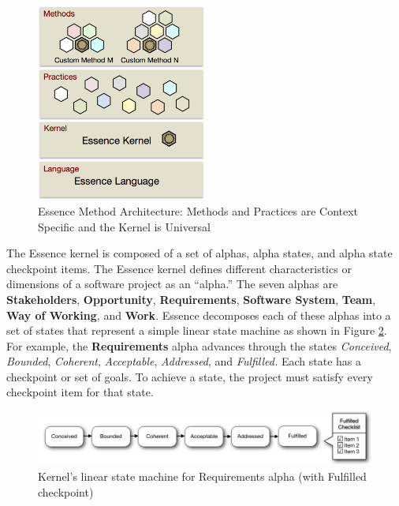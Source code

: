 \documentclass[preprint,12pt,3p]{elsarticle}
\begin{document}
\begin{figure}[h]\vspace*{4pt}
\centerline{\includegraphics[width=2.2in]{kernel_images/EssenceLayers}}
\caption{Essence Method Architecture: Methods and Practices are Context Specific and the Kernel is Universal}\vspace*{-6pt}\label{EssenceLayers}
\end{figure}

The Essence kernel is composed of a set of alphas, alpha states, and alpha state checkpoint items. The Essence kernel defines different characteristics or dimensions of a software project as an ``alpha.'' The seven alphas are \textbf{Stakeholders}, \textbf{Opportunity}, \textbf{Requirements}, \textbf{Software System}, \textbf{Team}, \textbf{Way of Working}, and \textbf{Work}. Essence decomposes each of these alphas into a set of states that represent a simple linear state machine as shown in Figure \ref{StateMachine}. For example, the \textbf{Requirements} alpha advances through the states \textit{Conceived}, \textit{Bounded}, \textit{Coherent}, \textit{Acceptable}, \textit{Addressed}, and \textit{Fulfilled.} Each state has a checkpoint or set of goals. To achieve a state, the project must satisfy every checkpoint item for that state. \cite{OMGStandard} 
 
\begin{figure}[h]\vspace*{4pt}
\centerline{\includegraphics[width=5.4in]{kernel_images/StateMachineRequirements}}
\caption{Kernel's linear state machine for Requirements alpha (with Fulfilled checkpoint)}\vspace*{-6pt}\label{StateMachine}
\end{figure}
\end{document}
